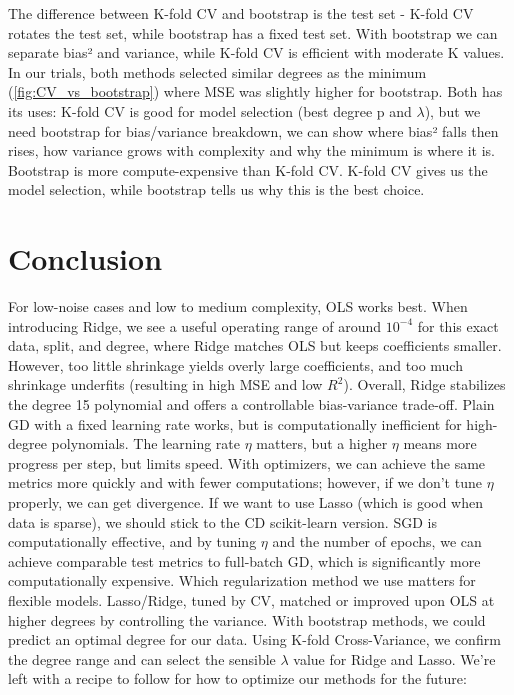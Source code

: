 \documentclass[amssymb,twocolumn,aps,floatfix]{revtex4-2}
\begin{document}
The difference between K-fold CV and bootstrap is the test set - K-fold CV rotates the test set, while bootstrap has a fixed test set. With bootstrap we can separate bias² and variance, while K-fold CV is efficient with moderate K values. In our trials, both methods selected similar degrees as the minimum (\ref{fig:CV_vs_bootstrap}) where MSE was slightly higher for bootstrap. Both has its uses: K-fold CV is good for model selection (best degree p and $\lambda$), but we need bootstrap for bias/variance breakdown, we can show where bias² falls then rises, how variance grows with complexity and why the minimum is where it is. Bootstrap is more compute-expensive than K-fold CV. K-fold CV gives us the model selection, while bootstrap tells us why this is the best choice. 


\section{Conclusion}\label{section:conclusion} 

For low-noise cases and low to medium complexity, OLS works best. When introducing Ridge, we see a useful operating range of around $10^{-4}$ for this exact data, split, and degree, where Ridge matches OLS but keeps coefficients smaller. However, too little shrinkage yields overly large coefficients, and too much shrinkage underfits (resulting in high MSE and low $R^2$). Overall, Ridge stabilizes the degree 15 polynomial and offers a controllable bias-variance trade-off. Plain GD with a fixed learning rate works, but is computationally inefficient for high-degree polynomials. The learning rate $\eta$ matters, but a higher $\eta$ means more progress per step, but limits speed. With optimizers, we can achieve the same metrics more quickly and with fewer computations; however, if we don't tune $\eta$ properly, we can get divergence. If we want to use Lasso (which is good when data is sparse), we should stick to the CD scikit-learn version. 
SGD is computationally effective, and by tuning $\eta$ and the number of epochs, we can achieve comparable test metrics to full-batch GD, which is significantly more computationally expensive. Which regularization method we use matters for flexible models. Lasso/Ridge, tuned by CV, matched or improved upon OLS at higher degrees by controlling the variance. With bootstrap methods, we could predict an optimal degree for our data. Using K-fold Cross-Variance, we confirm the degree range and can select the sensible $\lambda$ value for Ridge and Lasso. We're left with a recipe to follow for how to optimize our methods for the future: 
\end{document}
